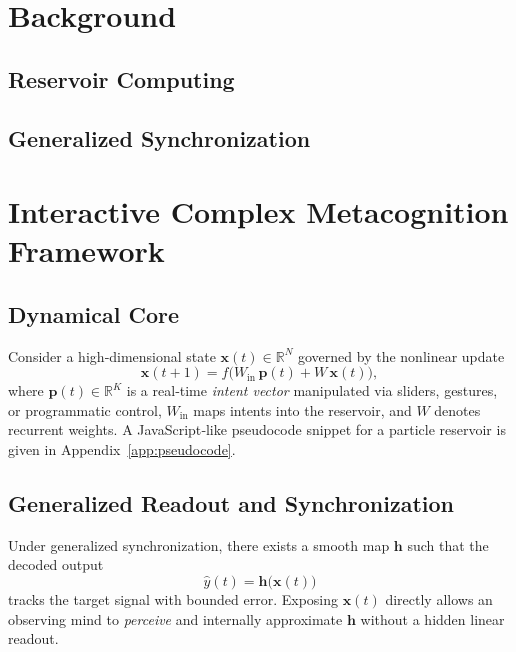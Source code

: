 \documentclass[11pt]{article}
\newcommand{\bx}{\mathbf{x}}
\newcommand{\bp}{\mathbf{p}}
\newcommand{\R}{\mathbb{R}}
\newcommand{\Win}{W_{\text{in}}}
\begin{document}
\section{Background}\label{sec:background}
\subsection{Reservoir Computing}

\subsection{Generalized Synchronization}

\section{Interactive Complex Metacognition Framework}\label{sec:framework}

\subsection{Dynamical Core}
Consider a high‑dimensional state $\bx(t)\in\R^{N}$ governed by the nonlinear update
\begin{equation}\label{eq:dynamical-core}
    \bx(t+1) = f\bigl(\Win\,\bp(t) + W\,\bx(t)\bigr),
\end{equation}
where $\bp(t)\in\R^{K}$ is a real‑time \emph{intent vector} manipulated via sliders, gestures, or programmatic control, $\Win$ maps intents into the reservoir, and $W$ denotes recurrent weights. A JavaScript‑like pseudocode snippet for a particle reservoir is given in Appendix~\ref{app:pseudocode}.

\subsection{Generalized Readout and Synchronization}
Under generalized synchronization, there exists a smooth map $\mathbf{h}$ such that the decoded output
\begin{equation}
    \hat y(t) = \mathbf{h}\bigl(\bx(t)\bigr)
\end{equation}
tracks the target signal with bounded error. Exposing $\bx(t)$ directly allows an observing mind to \emph{perceive} and internally approximate $\mathbf{h}$ without a hidden linear readout.
\end{document}

